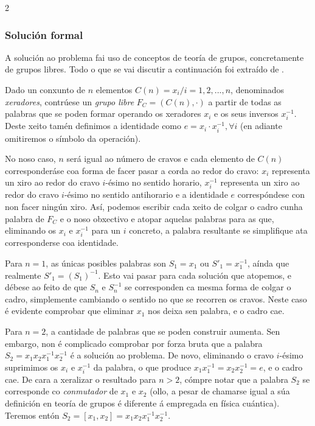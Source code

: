 \begin{refsection}
\begin{multicols}{2}
\subsubsection{Solución formal}

A solución ao problema fai uso de conceptos de teoría de grupos, concretamente
de grupos libres. Todo o que se vai discutir a continuación foi extraído de
\cite{demaine.ed.demaine.ml.minsky.yn.etal_2013}.

Dado un conxunto de $n$ elementos $C(n) = {x_i / i=1,2,...,n}$, denominados
\textit{xeradores}, contrúese un \textit{grupo libre} $F_C = (C(n),\cdot)$ a
partir de todas as palabras que se poden formar operando os xeradores $x_i$ e
os seus inversos $x_i^{-1}$. Deste xeito tamén definimos a identidade como $e =
x_i \cdot x_i^{-1}, \forall i$ (en adiante omitiremos o símbolo da operación).

No noso caso, $n$ será igual ao número de cravos e cada elemento de $C(n)$
corresponderáse coa forma de facer pasar a corda ao redor do cravo: $x_i$
representa un xiro ao redor do cravo $i$-ésimo no sentido horario, $x_i^{-1}$
representa un xiro ao redor do cravo $i$-ésimo no sentido antihorario e a
identidade $e$ correspóndese con non facer ningún xiro. Así, podemos escribir
cada xeito de colgar o cadro cunha palabra de $F_C$ e o noso obxectivo e atopar
aquelas palabras para as que, eliminando os $x_i$ e $x_i^{-1}$ para un $i$
concreto, a palabra resultante se simplifique ata corresponderse coa
identidade.

Para $n=1$, as únicas posibles palabras son $S_1 = x_1$ ou $S'_1=x_1^{-1}$,
aínda que realmente $S'_1 = (S_1)^{-1}$. Esto vai pasar para cada solución que
atopemos, e débese ao feito de que $S_n$ e $S_n^{-1}$ se corresponden ca mesma
forma de colgar o cadro, simplemente cambiando o sentido no que se recorren os
cravos. Neste caso é evidente comprobar que eliminar $x_1$ nos deixa sen
palabra, e o cadro cae.

Para $n=2$, a cantidade de palabras que se poden construir aumenta. Sen
embargo, non é complicado comprobar por forza bruta que a palabra $S_2 = x_1
x_2 x_1^{-1} x_2^{-1}$ é a solución ao problema. De novo, eliminando o cravo
$i$-ésimo suprimimos os $x_i$ e $x_i^{-1}$ da palabra, o que produce $x_1
x_1^{-1} = x_2 x_2^{-1} = e$, e o cadro cae. De cara a xeralizar o resultado
para $n>2$, cómpre notar que a palabra $S_2$ se corresponde co
\textit{conmutador} de $x_1$ e $x_2$ (ollo, a pesar de chamarse igual a súa
definición en teoría de grupos é diferente á empregada en física cuántica).
Teremos entón $S_2 = [x_1,x_2] = x_1 x_2 x_1^{-1} x_2^{-1}$.


\end{multicols}
\end{refsection}
